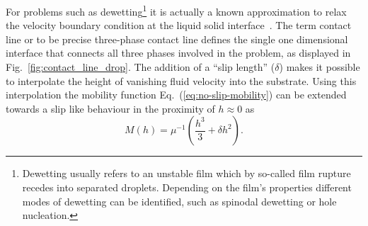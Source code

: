 For problems such as dewetting\footnote{Dewetting usually refers to an unstable film which by so-called film rupture recedes into separated droplets. Depending on the film's properties different modes of dewetting can be identified, such as spinodal dewetting or hole nucleation.} it is actually a known approximation to relax the velocity boundary condition at the liquid solid interface~\cite{munchDewettingRatesThin2005, munchLubricationModelsSmall2005, fetzerNewSlipRegimes2005}.
The term contact line or to be precise three-phase contact line defines the single one dimensional interface that connects all three phases involved in the problem, as displayed in Fig.~\ref{fig:contact_line_drop}.
The addition of a ``slip length'' ($\delta$) makes it possible to interpolate the height of vanishing fluid velocity into the substrate.
Using this interpolation the mobility function Eq.~(\ref{eq:no-slip-mobility}) can be extended towards a slip like behaviour in the proximity of $h\approx 0$ as
\begin{equation}\label{eq:slip_mobility}
    M(h) = \mu^{-1}\left(\frac{h^3}{3} + \delta h^2\right).
\end{equation}

